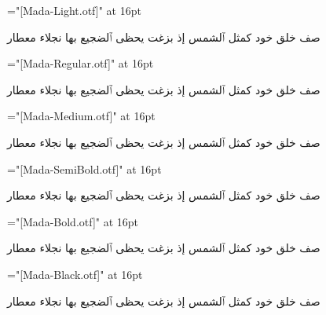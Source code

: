 \nopagenumbers
{}
\def\sample#1{%
  \font\test="[Mada-#1.otf]" at 16pt%
  \centerline{%
    \beginR%
    \test%
    صف خلق خود كمثل ٱلشمس إذ بزغت يحظى ٱلضجيع بها نجلاء معطار%
    \endR%
  }%
}

\sample{Light}
\sample{Regular}
\sample{Medium}
\sample{SemiBold}
\sample{Bold}
\sample{Black}
\bye
